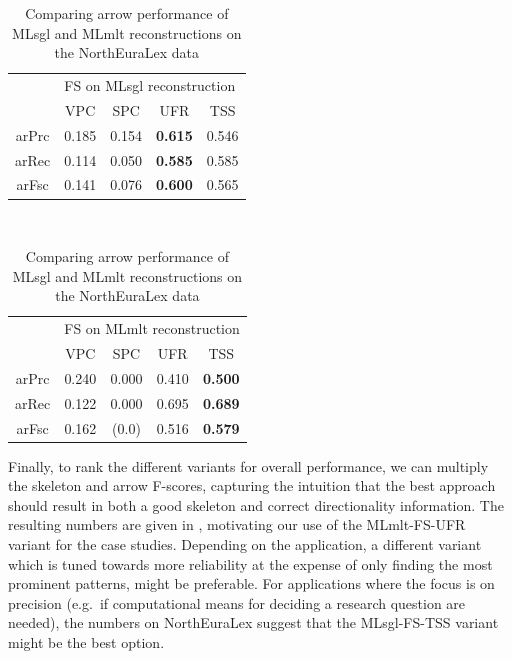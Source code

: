 \begin{table}
 \centering
 \begin{tabular}{ccccc}
  \hline \hline
   & \multicolumn{4}{l}{FS on MLsgl reconstruction}\\ 
   & VPC & SPC & UFR & TSS\\ \hline
  arPrc & 0.185 & 0.154 & \textbf{0.615} & 0.546\\
  arRec & 0.114 & 0.050 & \textbf{0.585} & 0.585\\
  arFsc & 0.141 & 0.076 & \textbf{0.600} & 0.565\\
  \hline
 \end{tabular}\\[0.5cm]
  \begin{tabular}{ccccc}
  \hline \hline
   & \multicolumn{4}{l}{FS on MLmlt reconstruction}\\ 
   & VPC & SPC & UFR & TSS\\ \hline
  arPrc & 0.240 & 0.000 & 0.410 & \textbf{0.500}\\
  arRec & 0.122 & 0.000 & 0.695 & \textbf{0.689}\\
  arFsc & 0.162 & (0.0) & 0.516 & \textbf{0.579}\\
  \hline
 \end{tabular}
 \caption{Comparing arrow performance of MLsgl and MLmlt reconstructions on the NorthEuraLex data}
 \label{arrow-evaluation-nelex}
\end{table}

Finally, to rank the different variants for overall performance, we can multiply the skeleton and arrow F-scores, capturing the intuition that the best approach should result in both a good skeleton and correct directionality information. The resulting numbers are given in , motivating our use of the MLmlt-FS-UFR variant for the case studies. Depending on the application, a different variant which is tuned towards more reliability at the expense of only finding the most prominent patterns, might be preferable. For applications where the focus is on precision (e.g.\ if computational means for deciding a research question are needed), the numbers on NorthEuraLex suggest that the MLsgl-FS-TSS variant might be the best option.

